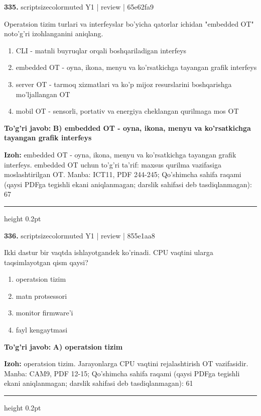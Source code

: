 \documentclass[10pt,a4paper]{article}
\begin{document}
{\bfseries\sffamily\color{ink} 335.} {scriptsizecolor{muted} Y1 | review | 65e62fa9}
\par
Operatsion tizim turlari va interfeyslar bo'yicha qatorlar ichidan "embedded OT" noto'g'ri izohlanganini aniqlang.
\begin{enumerate}[label=\Alph*),leftmargin=9mm]
\item CLI - matnli buyruqlar orqali boshqariladigan interfeys
\item embedded OT - oyna, ikona, menyu va ko'rsatkichga tayangan grafik interfeys
\item server OT - tarmoq xizmatlari va ko'p mijoz resurslarini boshqarishga mo'ljallangan OT
\item mobil OT - sensorli, portativ va energiya cheklangan qurilmaga mos OT
\end{enumerate}
\begin{tcolorbox}[enhanced,breakable,colback=teal!4,colframe=teal!60!black,boxrule=0.45pt,arc=1.2mm,left=2.7mm,right=2.7mm,top=1.8mm,bottom=1.8mm,before skip=2mm,after skip=2mm]
{\bfseries\sffamily\color{teal}To'g'ri javob:} \textbf{B) embedded OT - oyna, ikona, menyu va ko'rsatkichga tayangan grafik interfeys}
\par\smallskip
{\bfseries Izoh:} embedded OT - oyna, ikona, menyu va ko'rsatkichga tayangan grafik interfeys. embedded OT uchun to'g'ri ta'rif: maxsus qurilma vazifasiga moslashtirilgan OT. Manba: ICT11, PDF 244-245; Qo'shimcha sahifa raqami (qaysi PDFga tegishli ekani aniqlanmagan; darslik sahifasi deb tasdiqlanmagan): 67
\end{tcolorbox}
\vspace{2mm}\hrule height 0.2pt\vspace{3mm}

{\bfseries\sffamily\color{ink} 336.} {scriptsizecolor{muted} Y1 | review | 855e1aa8}
\par
Ikki dastur bir vaqtda ishlayotgandek ko'rinadi. CPU vaqtini ularga taqsimlayotgan qism qaysi?
\begin{enumerate}[label=\Alph*),leftmargin=9mm]
\item operatsion tizim
\item matn protsessori
\item monitor firmware'i
\item fayl kengaytmasi
\end{enumerate}
\begin{tcolorbox}[enhanced,breakable,colback=teal!4,colframe=teal!60!black,boxrule=0.45pt,arc=1.2mm,left=2.7mm,right=2.7mm,top=1.8mm,bottom=1.8mm,before skip=2mm,after skip=2mm]
{\bfseries\sffamily\color{teal}To'g'ri javob:} \textbf{A) operatsion tizim}
\par\smallskip
{\bfseries Izoh:} operatsion tizim. Jarayonlarga CPU vaqtini rejalashtirish OT vazifasidir. Manba: CAM9, PDF 12-15; Qo'shimcha sahifa raqami (qaysi PDFga tegishli ekani aniqlanmagan; darslik sahifasi deb tasdiqlanmagan): 61
\end{tcolorbox}
\vspace{2mm}\hrule height 0.2pt\vspace{3mm}
\end{document}
